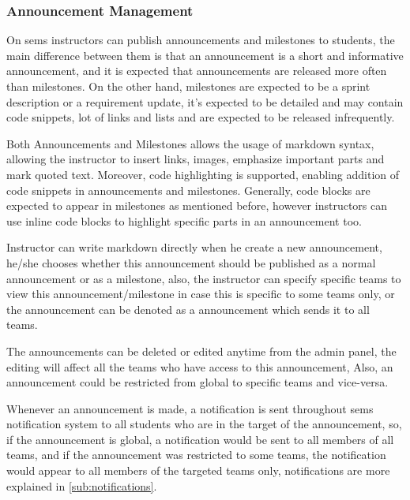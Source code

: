 \subsubsection{Announcement Management}
\label{subs:announcement-management}
On \ac{sems} instructors can publish announcements and milestones to students, the main difference between them
is that an announcement is a short and informative announcement, and it is expected that announcements are released
more often than milestones. On the other hand, milestones are expected to be a sprint description or a requirement update,
it's expected to be detailed and may contain code snippets, lot of links and lists and are expected to be released infrequently.

\newParagraph
Both Announcements and Milestones allows the usage of markdown syntax, allowing the instructor to insert links, images, emphasize important
parts and mark quoted text. Moreover, code highlighting is supported, enabling addition of code snippets in announcements and milestones. Generally,
code blocks are expected to appear in milestones as mentioned before, however instructors can use inline code blocks to highlight specific parts
in an announcement too.

\newParagraph
Instructor can write markdown directly when he create a new announcement, he/she chooses whether this announcement should be published
as a normal announcement or as a milestone, also, the instructor can specify specific teams to view this announcement/milestone in case
this is specific to some teams only, or the announcement can be denoted as a  announcement which sends it to all
teams.

\newParagraph
The announcements can be deleted or edited anytime from the admin panel, the editing will affect all the teams who have access to this announcement,
Also, an announcement could be restricted from global to specific teams and vice-versa.

\newParagraph
Whenever an announcement is made, a notification is sent throughout \ac{sems} notification system to all students who are in the target
of the announcement, so, if the announcement is global, a notification would be sent to all members of all teams, and if the announcement
was restricted to some teams, the notification would appear to all members of the targeted teams only, notifications are more explained in
\ref{sub:notifications}.

